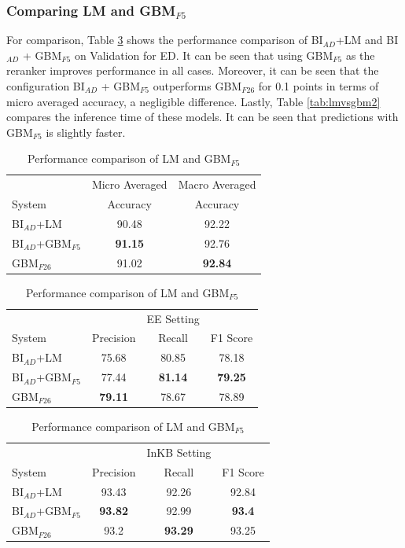 \documentclass{report}
\theoremstyle{definition}
\theoremstyle{remark}
\begin{document}
\subsubsection{Comparing LM and GBM$_{F5}$}
For comparison, Table \ref{tab:lmvsgbm} shows the performance comparison of BI$_{AD}$+LM and BI$_{AD}$ + GBM$_{F5}$ on Validation for ED. It can be seen that using GBM$_{F5}$ as the reranker improves performance in all cases. Moreover, it can be seen that the configuration BI$_{AD}$ + GBM$_{F5}$ outperforms GBM$_{F26}$ for 0.1 points in terms of micro averaged accuracy, a negligible difference. Lastly, Table \ref{tab:lmvsgbm2} compares the inference time of these models. It can be seen that predictions with GBM$_{F5}$ is slightly faster.

\begin{table}
    \centering
    \begin{tabular}{lcc}
    &Micro Averaged & Macro Averaged\\
    System     & Accuracy &Accuracy \\
    \hline
    BI$_{AD}$+LM& 90.48 &92.22\\
    BI$_{AD}$+GBM$_{F5}$ &\textbf{91.15} &92.76\\
    GBM$_{F26}$ & 91.02&	\textbf{92.84}\\
    \end{tabular}
    
    \vspace{0.5cm}\begin{tabular}{lccc}
    &&EE Setting & \\
    System    & Precision & Recall & F1 Score \\
    \hline
    BI$_{AD}$+LM & 75.68& 80.85& 78.18\\
    BI$_{AD}$+GBM$_{F5}$ &77.44&\textbf{81.14} &\textbf{79.25}\\
    GBM$_{F26}$   & \textbf{79.11}&	78.67&	78.89\\
    \end{tabular}
    
    \vspace{0.5cm}\begin{tabular}{lccc}
    &&InKB Setting & \\
    System    & Precision & Recall & F1 Score \\
    \hline
    BI$_{AD}$+LM  & 93.43& 92.26& 92.84\\
    BI$_{AD}$+GBM$_{F5}$ &\textbf{93.82} &92.99 &\textbf{93.4}\\
    GBM$_{F26}$   & 93.2&\textbf{93.29}&	93.25\\
    \end{tabular}
       
    \caption{Performance comparison of LM and GBM$_{F5}$}
    \label{tab:lmvsgbm}
\end{table}
\end{document}
